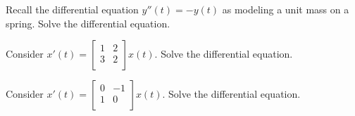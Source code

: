\documentclass[12pt,letterpaper]{article}
\begin{document}
\newpage


\begin{enumerate}

\Problem Recall the differential equation $y''(t) = -y(t)$ as modeling a unit mass on a spring. Solve the differential equation.

\newpage

\Problem Consider $x'(t) = \begin{bmatrix} 1 & 2\\ 3 & 2\\ \end{bmatrix} x(t)$. Solve the differential equation.

\vfill

\Problem Consider $x'(t) = \begin{bmatrix} 0 & -1\\ 1 & 0\\ \end{bmatrix} x(t)$. Solve the differential equation.

\vfill


\newpage


\end{enumerate}
\end{document}
